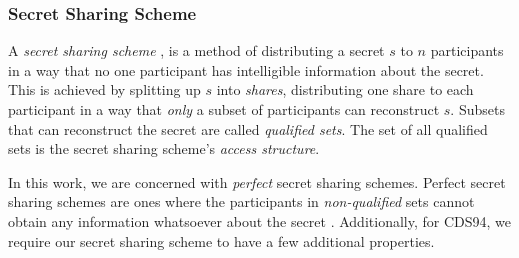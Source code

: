 \subsubsection{Secret Sharing Scheme}
A \textit{secret sharing scheme} \cite{DBLP:journals/cacm/Shamir79, DBLP:conf/mark2/Blakley79}, is a method of 
distributing a secret $s$ to $n$ participants in a way that no one participant has intelligible information about 
the secret. This is achieved by splitting up $s$ into \textit{shares}, distributing one share to each participant in 
a way that \textit{only} a subset of participants can reconstruct $s$. Subsets that can reconstruct the secret are 
called \textit{qualified sets}. The set of all qualified sets is the secret sharing scheme's \textit{access structure}.

In this work, we are concerned with \textit{perfect} secret sharing schemes. 
Perfect secret sharing schemes are ones where the participants in \textit{non-qualified} sets cannot obtain any information 
whatsoever about the secret \cite{CDS94}. Additionally, for CDS94, we require our secret sharing scheme to have a few 
additional properties. 

